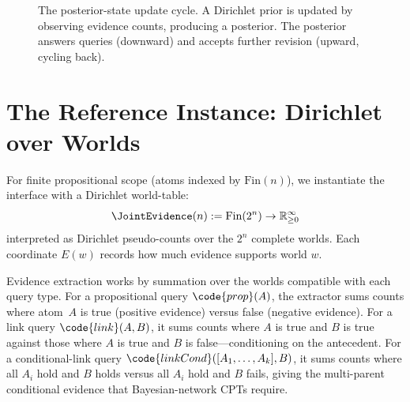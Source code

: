 \documentclass[11pt,openany]{report}
\begin{document}
\begin{figure}[htbp]
\centering
{}
\caption{The posterior-state update cycle.  A Dirichlet prior is updated by
observing evidence counts, producing a posterior.  The posterior answers
queries (downward) and accepts further revision (upward, cycling back).}
\label{fig:posterior-update-cycle}
\end{figure}

\section{The Reference Instance: Dirichlet over Worlds}

For finite propositional scope (atoms indexed by $\mathrm{Fin}(n)$), we
instantiate the \WorldModel{} interface with a Dirichlet world-table:
\[
  \JointEvidence(n) := \mathrm{Fin}(2^n) \to \mathbb{R}_{\ge 0}^{\infty}
\]
interpreted as Dirichlet pseudo-counts over the $2^n$ complete worlds.
Each coordinate $E(w)$ records how much evidence supports world $w$.

Evidence extraction works by summation over the worlds compatible with
each query type.  For a propositional query $\code{prop}(A)$, the
extractor sums counts where atom~$A$ is true (positive evidence) versus
false (negative evidence).  For a link query $\code{link}(A, B)$, it sums
counts where $A$ is true and $B$ is true against those where $A$ is true
and $B$ is false---conditioning on the antecedent.  For a conditional-link
query $\code{linkCond}([A_1, \ldots, A_k], B)$, it sums counts where all
$A_i$ hold and $B$ holds versus all $A_i$ hold and $B$ fails, giving the
multi-parent conditional evidence that Bayesian-network CPTs require.
\end{document}
